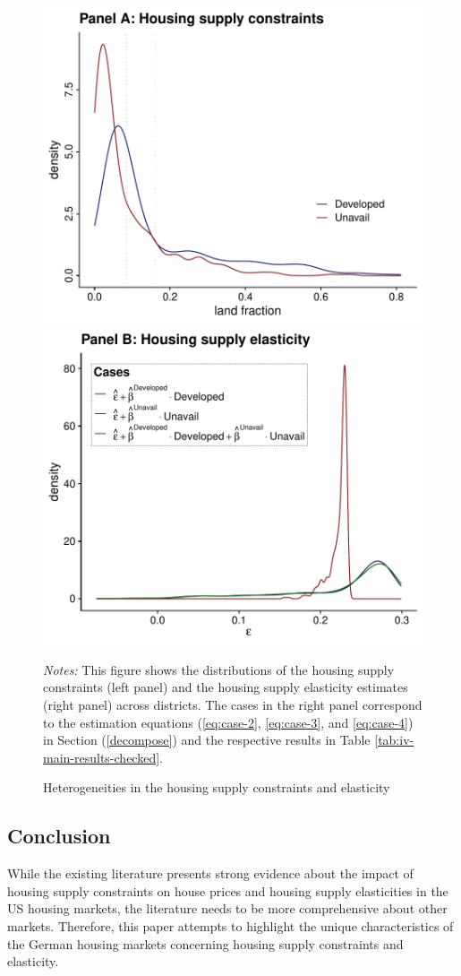 \documentclass[
  12pt,
]{article}
\begin{document}
\begin{figure}[H]
\centering

\begin{center}\includegraphics[width=0.495\linewidth]{output/figs/distributions-elasticity-constraints-1} \includegraphics[width=0.495\linewidth]{output/figs/distributions-elasticity-constraints-2} \end{center}

\caption{Heterogeneities in the housing supply constraints and elasticity}\label{fig:distributions-elasticity-constraints}
\medskip
\begin{minipage}{0.9\textwidth}
\footnotesize
\textit{Notes:} This figure shows the distributions of the housing supply constraints (left panel) and the housing supply elasticity estimates (right panel) across districts. The cases in the right panel correspond to the estimation equations (\ref{eq:case-2}, \ref{eq:case-3}, and \ref{eq:case-4}) in Section (\ref{decompose}) and the respective results in Table \ref{tab:iv-main-results-checked}.  
\end{minipage}
\end{figure}

\subsection{Conclusion}\label{conclusion}

While the existing literature presents strong evidence about the impact of housing supply constraints on house prices and housing supply elasticities in the US housing markets, the literature needs to be more comprehensive about other markets. Therefore, this paper attempts to highlight the unique characteristics of the German housing markets concerning housing supply constraints and elasticity.
\end{document}
